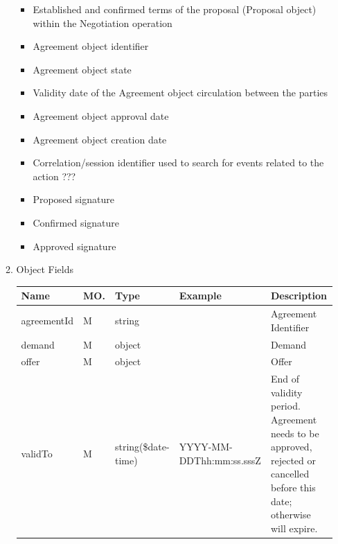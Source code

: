 \begin{enumerate}
\begin{enumerate}
\begin{itemize}

\item Established and confirmed terms of the proposal (Proposal object) within the Negotiation operation

\item Agreement object identifier

\item Agreement object state

\item Validity date of the Agreement object circulation between the parties

\item Agreement object approval date

\item Agreement object creation date

\item Correlation/session identifier used to search for events related to the action ???

\item Proposed signature

\item Confirmed signature

\item Approved signature

\end{itemize}

\item Object Fields

\begin{table}[H]
\footnotesize

\begin{center}
\begin{tabular}{|p{3cm}|l|p{3cm}|p{3cm}|p{4cm}|} 
\hline
\rowcolor{lightgray}	Name	& MO.	& Type	& Example & 	Description \\
\hline

agreementId			& M & string 				&				& 	Agreement Identifier \\
\hline

demand				& M	& object 				&				& 	Demand		\\
\hline

offer 				& M & object 				& 				& 	Offer 		\\
\hline

validTo				& M & string(\$date-time)	& YYYY-MM-DDThh:mm:ss.sssZ & End of validity period. 
																			Agreement needs to be approved, rejected or cancelled before this date; 
																			otherwise will expire. \\
\hline


\end{tabular}
\end{center}
\end{table}
\end{enumerate}
\end{enumerate}
